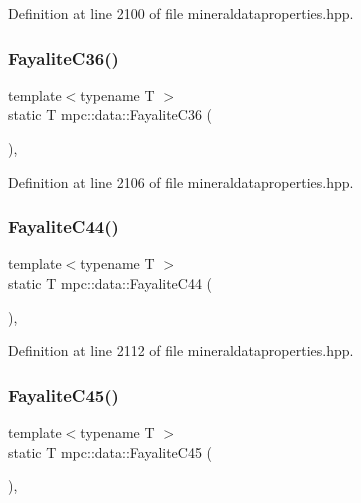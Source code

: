 Definition at line 2100 of file mineraldataproperties.\+hpp.

\mbox{\label{namespacempc_1_1data_a379acfe957ea01fa9574c8a62039f0d7}} 
\subsubsection{\texorpdfstring{Fayalite\+C36()}{FayaliteC36()}}
{\footnotesize\ttfamily template$<$typename T $>$ \\
static T mpc\+::data\+::\+Fayalite\+C36 (\begin{DoxyParamCaption}{ }\end{DoxyParamCaption})\hspace{0.3cm}{\ttfamily [inline]}, {\ttfamily [static]}}



Definition at line 2106 of file mineraldataproperties.\+hpp.

\mbox{\label{namespacempc_1_1data_a9df5ded5af4ff010161aadfa3c17d901}} 
\subsubsection{\texorpdfstring{Fayalite\+C44()}{FayaliteC44()}}
{\footnotesize\ttfamily template$<$typename T $>$ \\
static T mpc\+::data\+::\+Fayalite\+C44 (\begin{DoxyParamCaption}{ }\end{DoxyParamCaption})\hspace{0.3cm}{\ttfamily [inline]}, {\ttfamily [static]}}



Definition at line 2112 of file mineraldataproperties.\+hpp.

\mbox{\label{namespacempc_1_1data_a3b48fd43a65a420e7e999ba08a031b07}} 
\subsubsection{\texorpdfstring{Fayalite\+C45()}{FayaliteC45()}}
{\footnotesize\ttfamily template$<$typename T $>$ \\
static T mpc\+::data\+::\+Fayalite\+C45 (\begin{DoxyParamCaption}{ }\end{DoxyParamCaption})\hspace{0.3cm}{\ttfamily [inline]}, {\ttfamily [static]}}



